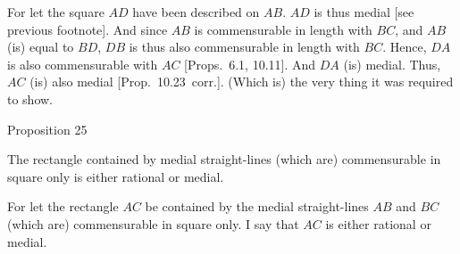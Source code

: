 For let the square $AD$ have been described on $AB$. $AD$ is thus medial [see previous footnote]. And since $AB$ is commensurable in length
with $BC$, and $AB$ (is) equal to $BD$, $DB$ is thus also commensurable
in length with $BC$. Hence, $DA$ is also commensurable with $AC$
[Props.~6.1, 10.11].
And $DA$ (is) medial. Thus, $AC$ (is) also medial [Prop.~10.23~corr.]. (Which is) the very thing it
was required to show.

\epsfysize=2.2in
\centerline{}


\begin{center}
{\large Proposition 25}
\end{center}

The rectangle contained by medial
straight-lines (which are) commensurable in square only is either
rational or medial.

\epsfysize=1.8in
\centerline{}

For let the rectangle $AC$ be contained by the medial straight-lines
$AB$ and $BC$ (which are) commensurable in square only. I say that
$AC$ is either rational or medial.


